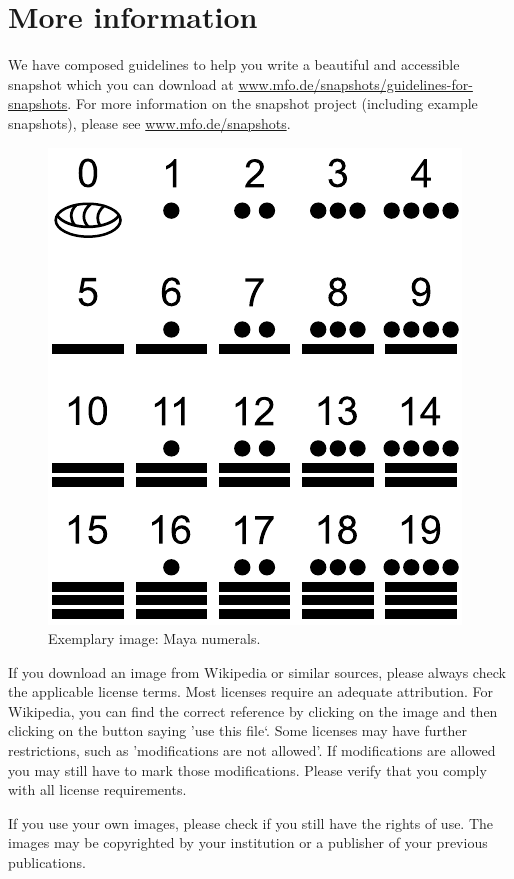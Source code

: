 \documentclass{snapshotmfo}
\begin{document}
\section{More information}
We have composed guidelines to help you write a beautiful and accessible snapshot which you can download at \href{https://www.mfo.de/snapshots/guidelines-for-snapshots}{www.mfo.de/snapshots/guidelines-for-snapshots}. For more information on the snapshot project (including example snapshots), please see \href{https://www.mfo.de/snapshots}{www.mfo.de/snapshots}.

\begin{figure}[ht]
        \centering 
        \includegraphics[width= 0.33 \textwidth]{maya.pdf}
        \caption{Exemplary image: Maya numerals.}
\label{fig:maya}
\end{figure}

If you download an image from Wikipedia or similar sources, please always check the applicable license terms. Most licenses require an adequate attribution. For Wikipedia, you can find the correct reference by clicking on the image and then clicking on the button saying 'use this file‘. Some licenses may have further restrictions, such as 'modifications are not allowed'. If modifications are allowed you may still have to mark those modifications. Please verify that you comply with all license requirements.

If you use your own images, please check if you still have the rights of use. The images may be copyrighted by your institution or a publisher of your previous publications.

\clearpage
\end{document}
